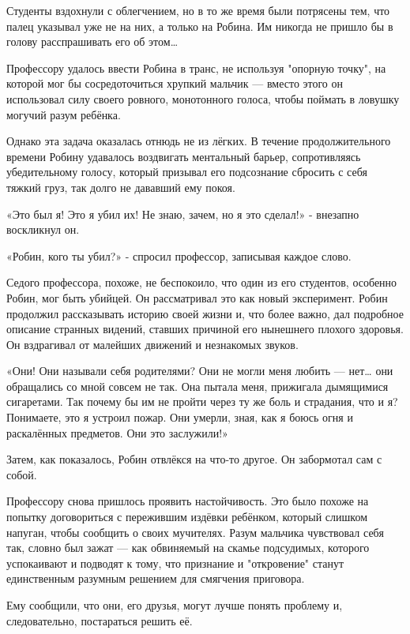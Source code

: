 \documentclass[a4paper,12pt]{book}
\begin{document}
\par
Студенты вздохнули с облегчением, но в то же время были потрясены тем, что палец указывал уже не на них, а только на Робина. Им никогда не пришло бы в голову расспрашивать его об этом…
\par
Профессору удалось ввести Робина в транс, не используя "опорную точку", на которой мог бы сосредоточиться хрупкий мальчик — вместо этого он использовал силу своего ровного, монотонного голоса, чтобы поймать в ловушку могучий разум ребёнка.
\par
Однако эта задача оказалась отнюдь не из лёгких. В течение продолжительного времени Робину удавалось воздвигать ментальный барьер, сопротивляясь убедительному голосу, который призывал его подсознание сбросить с себя тяжкий груз, так долго не дававший ему покоя.
\par
«Это был я! Это я убил их! Не знаю, зачем, но я это сделал!» - внезапно воскликнул он.
\par
«Робин, кого ты убил?» - спросил профессор, записывая каждое слово.
\par
Седого профессора, похоже, не беспокоило, что один из его студентов, особенно Робин, мог быть убийцей. Он рассматривал это как новый эксперимент. Робин продолжил рассказывать историю своей жизни и, что более важно, дал подробное описание странных видений, ставших причиной его нынешнего плохого здоровья. Он вздрагивал от малейших движений и незнакомых звуков.
\par
«Они! Они называли себя родителями? Они не могли меня любить — нет… они обращались со мной совсем не так. Она пытала меня, прижигала дымящимися сигаретами. Так почему бы им не пройти через ту же боль и страдания, что и я? Понимаете, это я устроил пожар. Они умерли, зная, как я боюсь огня и раскалённых предметов. Они это заслужили!»
\par
Затем, как показалось, Робин отвлёкся на что-то другое. Он забормотал сам с собой.
\par
Профессору снова пришлось проявить настойчивость. Это было похоже на попытку договориться с пережившим издёвки ребёнком, который слишком напуган, чтобы сообщить о своих мучителях. Разум мальчика чувствовал себя так, словно был зажат — как обвиняемый на скамье подсудимых, которого успокаивают и подводят к тому, что признание и "откровение" станут единственным разумным решением для смягчения приговора.
\par
Ему сообщили, что они, его друзья, могут лучше понять проблему и, следовательно, постараться решить её.
\par
\end{document}
